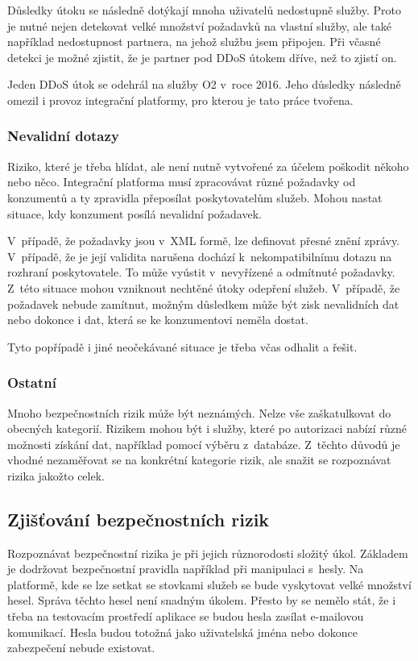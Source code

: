 \documentclass[thesis=M,czech]{FITthesis}[2012/10/20]
\begin{document}
				Důsledky útoku se následně dotýkají mnoha uživatelů nedostupně služby. Proto je nutné nejen detekovat velké množství požadavků na vlastní služby, ale také například nedostupnost partnera, na jehož službu jsem připojen. Při včasné detekci je možné zjistit, že je partner pod DDoS útokem dříve, než to zjistí on. 
				
			    Jeden DDoS útok se odehrál na služby O2 v~roce 2016. Jeho důsledky následně omezil i provoz integrační platformy, pro kterou je tato práce tvořena. 
			
			\subsubsection{Nevalidní dotazy}
				Riziko, které je třeba hlídat, ale není nutně vytvořené za účelem poškodit někoho nebo něco. Integrační platforma musí zpracovávat různé požadavky od konzumentů a ty zpravidla přeposílat poskytovatelům služeb. Mohou nastat situace, kdy konzument posílá nevalidní požadavek.
			
				V~případě, že požadavky jsou v~XML formě, lze definovat přesné znění zprávy. V~případě, že je její validita narušena dochází k~nekompatibilnímu dotazu na rozhraní poskytovatele. To může vyústit v~nevyřízené a odmítnuté požadavky. Z~této situace mohou vzniknout nechtěné útoky odepření služeb. V~případě, že požadavek nebude zamítnut, možným důsledkem může být zisk nevalidních dat nebo dokonce i dat, která se ke konzumentovi neměla dostat.
			
				Tyto popřípadě i jiné neočekávané situace je třeba včas odhalit a řešit.
				
			\subsubsection{Ostatní}
				Mnoho bezpečnostních rizik může být neznámých. Nelze vše zaškatulkovat do obecných kategorií. Rizikem mohou být i služby, které po autorizaci nabízí různé možnosti získání dat, například pomocí výběru z~databáze. Z~těchto důvodů je vhodné nezaměřovat se na konkrétní kategorie rizik, ale snažit se rozpoznávat rizika jakožto celek.	
			
		\subsection{Zjišťování bezpečnostních rizik}
			Rozpoznávat bezpečnostní rizika je při jejich různorodosti složitý úkol. Základem je dodržovat bezpečnostní pravidla například při manipulaci s~hesly. Na platformě, kde se lze setkat se stovkami služeb se bude vyskytovat velké množství hesel. Správa těchto hesel není snadným úkolem. Přesto by se nemělo stát, že i třeba na testovacím prostředí aplikace se budou hesla zasílat e-mailovou komunikací. Hesla budou totožná jako uživatelská jména nebo dokonce zabezpečení nebude existovat. 
			
\end{document}
